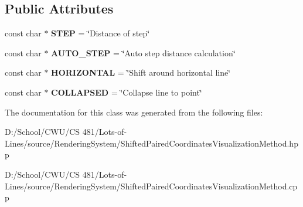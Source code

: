 \subsection*{Public Attributes}
\begin{DoxyCompactItemize}
\item 
const char $\ast$ {\bfseries S\+T\+EP} = \char`\"{}Distance of step\char`\"{}\hypertarget{class_lots_of_lines_1_1_shifted_paired_coordinates_visualization_method_ab86f2a4935bca666b6ec8b6f470e78b5}{}\label{class_lots_of_lines_1_1_shifted_paired_coordinates_visualization_method_ab86f2a4935bca666b6ec8b6f470e78b5}

\item 
const char $\ast$ {\bfseries A\+U\+T\+O\+\_\+\+S\+T\+EP} = \char`\"{}Auto step distance calculation\char`\"{}\hypertarget{class_lots_of_lines_1_1_shifted_paired_coordinates_visualization_method_ac7cd5880cd0caa625d40b173e761cbdc}{}\label{class_lots_of_lines_1_1_shifted_paired_coordinates_visualization_method_ac7cd5880cd0caa625d40b173e761cbdc}

\item 
const char $\ast$ {\bfseries H\+O\+R\+I\+Z\+O\+N\+T\+AL} = \char`\"{}Shift around horizontal line\char`\"{}\hypertarget{class_lots_of_lines_1_1_shifted_paired_coordinates_visualization_method_a6cad17ef30257ed3e1500bfb57d2387b}{}\label{class_lots_of_lines_1_1_shifted_paired_coordinates_visualization_method_a6cad17ef30257ed3e1500bfb57d2387b}

\item 
const char $\ast$ {\bfseries C\+O\+L\+L\+A\+P\+S\+ED} = \char`\"{}Collapse line to point\char`\"{}\hypertarget{class_lots_of_lines_1_1_shifted_paired_coordinates_visualization_method_ab82d61945baf2ab958e84bfef8db8ccf}{}\label{class_lots_of_lines_1_1_shifted_paired_coordinates_visualization_method_ab82d61945baf2ab958e84bfef8db8ccf}

\end{DoxyCompactItemize}


The documentation for this class was generated from the following files\+:\begin{DoxyCompactItemize}
\item 
D\+:/\+School/\+C\+W\+U/\+C\+S 481/\+Lots-\/of-\/\+Lines/source/\+Rendering\+System/Shifted\+Paired\+Coordinates\+Visualization\+Method.\+hpp\item 
D\+:/\+School/\+C\+W\+U/\+C\+S 481/\+Lots-\/of-\/\+Lines/source/\+Rendering\+System/Shifted\+Paired\+Coordinates\+Visualization\+Method.\+cpp\end{DoxyCompactItemize}
